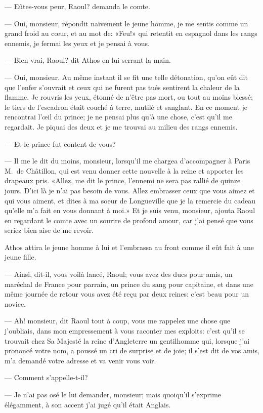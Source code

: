 — Eûtes-vous peur, Raoul? demanda le comte.

— Oui, monsieur, répondit naïvement le jeune homme, je me sentis comme un grand froid au cœur, et au mot de: «Feu!» qui retentit en espagnol dans les rangs ennemis, je fermai les yeux et je pensai à vous.

— Bien vrai, Raoul? dit Athos en lui serrant la main.

— Oui, monsieur. Au même instant il se fit une telle détonation, qu'on eût dit que l'enfer s'ouvrait et ceux qui ne furent pas tués sentirent la chaleur de la flamme. Je rouvris les yeux, étonné de n'être pas mort, ou tout au moins blessé; le tiers de l'escadron était couché à terre, mutilé et sanglant. En ce moment je rencontrai l'œil du prince; je ne pensai plus qu'à une chose, c'est qu'il me regardait. Je piquai des deux et je me trouvai au milieu des rangs ennemis.

— Et le prince fut content de vous?

— Il me le dit du moins, monsieur, lorsqu'il me chargea d'accompagner à Paris M.~de Châtillon, qui est venu donner cette nouvelle à la reine et apporter les drapeaux pris. «Allez, me dit le prince, l'ennemi ne sera pas rallié de quinze jours. D'ici là je n'ai pas besoin de vous. Allez embrasser ceux que vous aimez et qui vous aiment, et dites à ma soeur de Longueville que je la remercie du cadeau qu'elle m'a fait en vous donnant à moi.» Et je suis venu, monsieur, ajouta Raoul en regardant le comte avec un sourire de profond amour, car j'ai pensé que vous seriez bien aise de me revoir.

Athos attira le jeune homme à lui et l'embrassa au front comme il eût fait à une jeune fille.

— Ainsi, dit-il, vous voilà lancé, Raoul; vous avez des ducs pour amis, un maréchal de France pour parrain, un prince du sang pour capitaine, et dans une même journée de retour vous avez été reçu par deux reines: c'est beau pour un novice.

— Ah! monsieur, dit Raoul tout à coup, vous me rappelez une chose que j'oubliais, dans mon empressement à vous raconter mes exploits: c'est qu'il se trouvait chez Sa Majesté la reine d'Angleterre un gentilhomme qui, lorsque j'ai prononcé votre nom, a poussé un cri de surprise et de joie; il s'est dit de vos amis, m'a demandé votre adresse et va venir vous voir.

— Comment s'appelle-t-il?

— Je n'ai pas osé le lui demander, monsieur; mais quoiqu'il s'exprime élégamment, à son accent j'ai jugé qu'il était Anglais.

